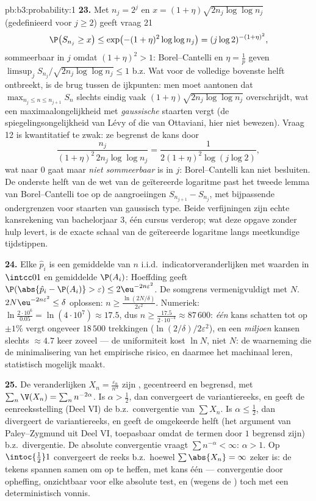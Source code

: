 \begin{solution}{pb:b3:probability:1}
\textbf{23.} Met $n_j = 2^j$ en $x = (1 + \eta)\sqrt{2n_j\log\log
n_j}$ (gedefinieerd voor $j \geq 2$) geeft vraag 21
\[
\P\bigl(S_{n_j} \geq x\bigr) \leq \exp\bigl(-(1 +
\eta)^2\log\log n_j\bigr) = (j\log 2)^{-(1+\eta)^2},
\]
sommeerbaar in $j$ omdat $(1 + \eta)^2 > 1$: Borel--Cantelli en
$\eta = \frac1p$ geven $\limsup_jS_{n_j}/\sqrt{2n_j \log\log
n_j} \leq 1$ b.z. Wat voor de volledige bovenste helft ontbreekt,
is de brug tussen de ijkpunten: men moet aantonen dat
$\max_{n_j\leq n\leq n_{j+1}}S_n$ slechts eindig vaak $(1+\eta)
\sqrt{2n_j\log\log n_j}$ overschrijdt, wat een
maximaalongelijkheid met \emph{gaussische} staarten vergt (de
spiegelingsongelijkheid van Lévy of die van Ottaviani, hier niet
bewezen). Vraag 12 is kwantitatief te zwak: ze begrenst de kans
door
\[
\frac{n_j}{(1+\eta)^2\,2n_j\log\log n_j}
= \frac{1}{2(1+\eta)^2\log(j\log2)},
\]
wat naar $0$ gaat maar \emph{niet sommeerbaar} is in $j$:
Borel--Cantelli kan niet besluiten. De onderste helft van de wet
van de geïtereerde logaritme past het tweede lemma van
Borel--Cantelli toe op de  aangroeiingen
$S_{n_{j+1}} - S_{n_j}$, met bijpassende ondergrenzen voor
staarten van gaussisch type. Beide verfijningen zijn echte
kansrekening van bachelorjaar 3, één cursus verderop; wat deze
opgave zonder hulp levert, is de exacte schaal van de geïtereerde
logaritme langs meetkundige tijdstippen.

\textbf{24.} Elke $\hat p_i$ is een gemiddelde van $n$ i.i.d.\
indicatorveranderlijken met waarden in $\intcc01$ en gemiddelde
$\P(A_i)$: Hoeffding geeft $\P(\abs{\hat p_i - \P(A_i)} >
\varepsilon) \leq 2\eu^{-2n\varepsilon^2}$. De somgrens
vermenigvuldigt met $N$. $2N\eu^{-2n\varepsilon^2} \leq \delta$
oplossen: $n \geq \frac{\ln(2N/\delta)}{2\varepsilon^2}$.
Numeriek: $\ln\frac{2\cdot10^6}{0.05} = \ln(4\cdot10^7) \approx
17.5$, dus $n \geq \frac{17.5}{2\cdot10^{-4}} \approx 87\,600$:
\emph{één} kans schatten tot op $\pm1\%$ vergt ongeveer $18\,500$
trekkingen ($\ln(2/\delta)/2\varepsilon^2$), en een
\emph{miljoen} kansen slechts $\approx 4.7$ keer zoveel --- de
uniformiteit kost $\ln N$, niet $N$: de waarneming die de
minimalisering van het empirische risico, en daarmee het machinaal
leren, statistisch mogelijk maakt.

\textbf{25.} De veranderlijken $X_n = \frac{\varepsilon_n}
{n^\alpha}$ zijn , gecentreerd en begrensd, met
$\sum_n\V(X_n) = \sum_nn^{-2\alpha}$. Is $\alpha > \frac12$, dan
convergeert de variantiereeks, en geeft de eenreeksstelling (Deel
VI) de b.z.\ convergentie van $\sum X_n$. Is $\alpha \leq
\frac12$, dan divergeert de variantiereeks, en geeft de omgekeerde
helft (het argument van Paley--Zygmund uit Deel VI, toepasbaar
omdat de termen door $1$ begrensd zijn) b.z.\ divergentie. De
absolute convergentie vraagt $\sum n^{-\alpha} < \infty$: $\alpha
> 1$. Op $\intoc{\frac12}1$ convergeert de reeks b.z.\ hoewel
$\sum\abs{X_n} = \infty$ zeker is: de tekens spannen samen om op
te heffen, met kans één --- convergentie door opheffing,
onzichtbaar voor elke absolute test, en (wegens de )
toch met een deterministisch vonnis.
\end{solution}
